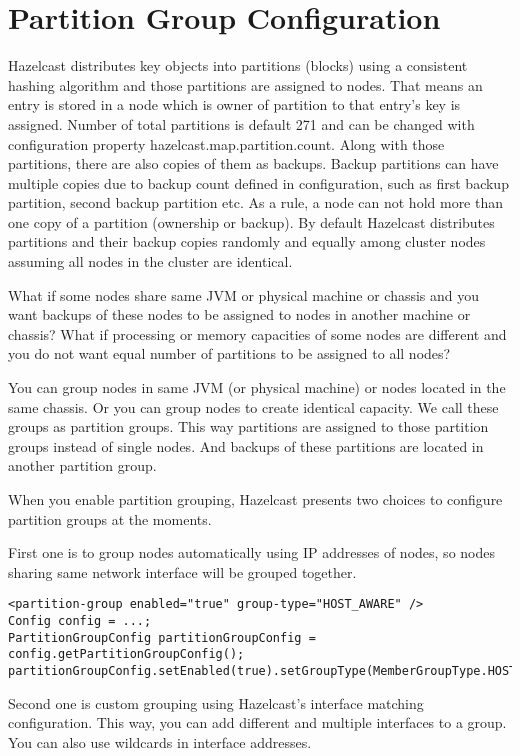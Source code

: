\section{Partition Group Configuration}
Hazelcast distributes key objects into partitions (blocks) using a consistent hashing algorithm and those partitions are assigned to nodes. That means an entry is stored in a node which is owner of partition to that entry's key is assigned. Number of total partitions is default 271 and can be changed with configuration property hazelcast.map.partition.count. Along with those partitions, there are also copies of them as backups. Backup partitions can have multiple copies due to backup count defined in configuration, such as first backup partition, second backup partition etc. As a rule, a node can not hold more than one copy of a partition (ownership or backup). By default Hazelcast distributes partitions and their backup copies randomly and equally among cluster nodes assuming all nodes in the cluster are identical.

What if some nodes share same JVM or physical machine or chassis and you want backups of these nodes to be assigned to nodes in another machine or chassis? What if processing or memory capacities of some nodes are different and you do not want equal number of partitions to be assigned to all nodes?

You can group nodes in same JVM (or physical machine) or nodes located in the same chassis. Or you can group nodes to create identical capacity. We call these groups as partition groups. This way partitions are assigned to those partition groups instead of single nodes. And backups of these partitions are located in another partition group.

When you enable partition grouping, Hazelcast presents two choices to configure partition groups at the moments.

First one is to group nodes automatically using IP addresses of nodes, so nodes sharing same network interface will be grouped together.

\begin{lstlisting}
<partition-group enabled="true" group-type="HOST_AWARE" />
Config config = ...;
PartitionGroupConfig partitionGroupConfig = config.getPartitionGroupConfig();
partitionGroupConfig.setEnabled(true).setGroupType(MemberGroupType.HOST_AWARE);
\end{lstlisting}

Second one is custom grouping using Hazelcast's interface matching configuration. This way, you can add different and multiple interfaces to a group. You can also use wildcards in interface addresses.

